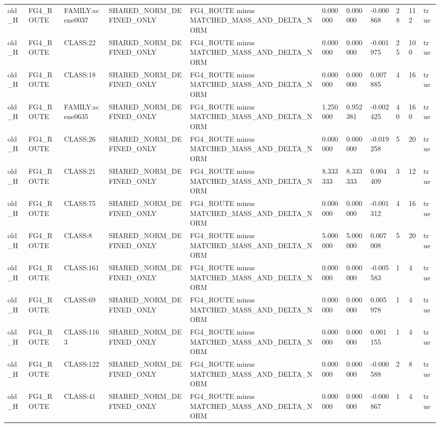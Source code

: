 \begin{tabular}{lllllllllll}
old\_H & FG4\_ROUTE & FAMILY:scene0037 & SHARED\_NORM\_DEFINED\_ONLY & FG4\_ROUTE minus MATCHED\_MASS\_AND\_DELTA\_NORM & 0.000000 & 0.000000 & -0.000868 & 28 & 112 & true \\
old\_H & FG4\_ROUTE & CLASS:22 & SHARED\_NORM\_DEFINED\_ONLY & FG4\_ROUTE minus MATCHED\_MASS\_AND\_DELTA\_NORM & 0.000000 & 0.000000 & -0.001975 & 25 & 100 & true \\
old\_H & FG4\_ROUTE & CLASS:18 & SHARED\_NORM\_DEFINED\_ONLY & FG4\_ROUTE minus MATCHED\_MASS\_AND\_DELTA\_NORM & 0.000000 & 0.000000 & 0.007885 & 4 & 16 & true \\
old\_H & FG4\_ROUTE & FAMILY:scene0635 & SHARED\_NORM\_DEFINED\_ONLY & FG4\_ROUTE minus MATCHED\_MASS\_AND\_DELTA\_NORM & 1.250000 & 0.952381 & -0.002425 & 40 & 160 & true \\
old\_H & FG4\_ROUTE & CLASS:26 & SHARED\_NORM\_DEFINED\_ONLY & FG4\_ROUTE minus MATCHED\_MASS\_AND\_DELTA\_NORM & 0.000000 & 0.000000 & -0.019258 & 5 & 20 & true \\
old\_H & FG4\_ROUTE & CLASS:21 & SHARED\_NORM\_DEFINED\_ONLY & FG4\_ROUTE minus MATCHED\_MASS\_AND\_DELTA\_NORM & 8.333333 & 8.333333 & 0.004409 & 3 & 12 & true \\
old\_H & FG4\_ROUTE & CLASS:75 & SHARED\_NORM\_DEFINED\_ONLY & FG4\_ROUTE minus MATCHED\_MASS\_AND\_DELTA\_NORM & 0.000000 & 0.000000 & -0.001312 & 4 & 16 & true \\
old\_H & FG4\_ROUTE & CLASS:8 & SHARED\_NORM\_DEFINED\_ONLY & FG4\_ROUTE minus MATCHED\_MASS\_AND\_DELTA\_NORM & 5.000000 & 5.000000 & 0.007008 & 5 & 20 & true \\
old\_H & FG4\_ROUTE & CLASS:161 & SHARED\_NORM\_DEFINED\_ONLY & FG4\_ROUTE minus MATCHED\_MASS\_AND\_DELTA\_NORM & 0.000000 & 0.000000 & -0.005583 & 1 & 4 & true \\
old\_H & FG4\_ROUTE & CLASS:69 & SHARED\_NORM\_DEFINED\_ONLY & FG4\_ROUTE minus MATCHED\_MASS\_AND\_DELTA\_NORM & 0.000000 & 0.000000 & 0.005978 & 1 & 4 & true \\
old\_H & FG4\_ROUTE & CLASS:1163 & SHARED\_NORM\_DEFINED\_ONLY & FG4\_ROUTE minus MATCHED\_MASS\_AND\_DELTA\_NORM & 0.000000 & 0.000000 & 0.001155 & 1 & 4 & true \\
old\_H & FG4\_ROUTE & CLASS:122 & SHARED\_NORM\_DEFINED\_ONLY & FG4\_ROUTE minus MATCHED\_MASS\_AND\_DELTA\_NORM & 0.000000 & 0.000000 & -0.000588 & 2 & 8 & true \\
old\_H & FG4\_ROUTE & CLASS:41 & SHARED\_NORM\_DEFINED\_ONLY & FG4\_ROUTE minus MATCHED\_MASS\_AND\_DELTA\_NORM & 0.000000 & 0.000000 & -0.000867 & 1 & 4 & true \\

\end{tabular}
